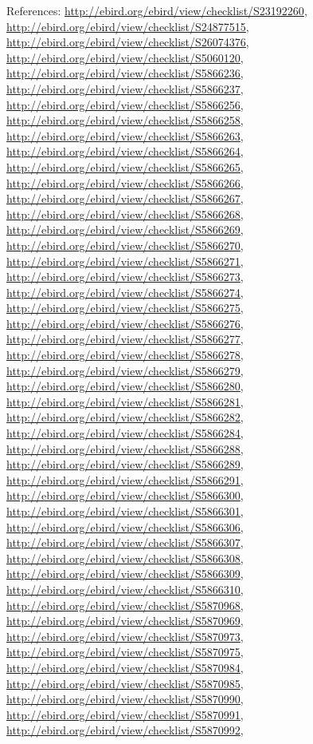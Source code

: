 \documentclass[9pt, article]{memoir}
\begin{document}
\begin{multicols}{2}
References: 
\url{http://ebird.org/ebird/view/checklist/S23192260}, 
\url{http://ebird.org/ebird/view/checklist/S24877515}, 
\url{http://ebird.org/ebird/view/checklist/S26074376}, 
\url{http://ebird.org/ebird/view/checklist/S5060120}, 
\url{http://ebird.org/ebird/view/checklist/S5866236}, 
\url{http://ebird.org/ebird/view/checklist/S5866237}, 
\url{http://ebird.org/ebird/view/checklist/S5866256}, 
\url{http://ebird.org/ebird/view/checklist/S5866258}, 
\url{http://ebird.org/ebird/view/checklist/S5866263}, 
\url{http://ebird.org/ebird/view/checklist/S5866264}, 
\url{http://ebird.org/ebird/view/checklist/S5866265}, 
\url{http://ebird.org/ebird/view/checklist/S5866266}, 
\url{http://ebird.org/ebird/view/checklist/S5866267}, 
\url{http://ebird.org/ebird/view/checklist/S5866268}, 
\url{http://ebird.org/ebird/view/checklist/S5866269}, 
\url{http://ebird.org/ebird/view/checklist/S5866270}, 
\url{http://ebird.org/ebird/view/checklist/S5866271}, 
\url{http://ebird.org/ebird/view/checklist/S5866273}, 
\url{http://ebird.org/ebird/view/checklist/S5866274}, 
\url{http://ebird.org/ebird/view/checklist/S5866275}, 
\url{http://ebird.org/ebird/view/checklist/S5866276}, 
\url{http://ebird.org/ebird/view/checklist/S5866277}, 
\url{http://ebird.org/ebird/view/checklist/S5866278}, 
\url{http://ebird.org/ebird/view/checklist/S5866279}, 
\url{http://ebird.org/ebird/view/checklist/S5866280}, 
\url{http://ebird.org/ebird/view/checklist/S5866281}, 
\url{http://ebird.org/ebird/view/checklist/S5866282}, 
\url{http://ebird.org/ebird/view/checklist/S5866284}, 
\url{http://ebird.org/ebird/view/checklist/S5866288}, 
\url{http://ebird.org/ebird/view/checklist/S5866289}, 
\url{http://ebird.org/ebird/view/checklist/S5866291}, 
\url{http://ebird.org/ebird/view/checklist/S5866300}, 
\url{http://ebird.org/ebird/view/checklist/S5866301}, 
\url{http://ebird.org/ebird/view/checklist/S5866306}, 
\url{http://ebird.org/ebird/view/checklist/S5866307}, 
\url{http://ebird.org/ebird/view/checklist/S5866308}, 
\url{http://ebird.org/ebird/view/checklist/S5866309}, 
\url{http://ebird.org/ebird/view/checklist/S5866310}, 
\url{http://ebird.org/ebird/view/checklist/S5870968}, 
\url{http://ebird.org/ebird/view/checklist/S5870969}, 
\url{http://ebird.org/ebird/view/checklist/S5870973}, 
\url{http://ebird.org/ebird/view/checklist/S5870975}, 
\url{http://ebird.org/ebird/view/checklist/S5870984}, 
\url{http://ebird.org/ebird/view/checklist/S5870985}, 
\url{http://ebird.org/ebird/view/checklist/S5870990}, 
\url{http://ebird.org/ebird/view/checklist/S5870991}, 
\url{http://ebird.org/ebird/view/checklist/S5870992}, 

\end{multicols}
\end{document}
